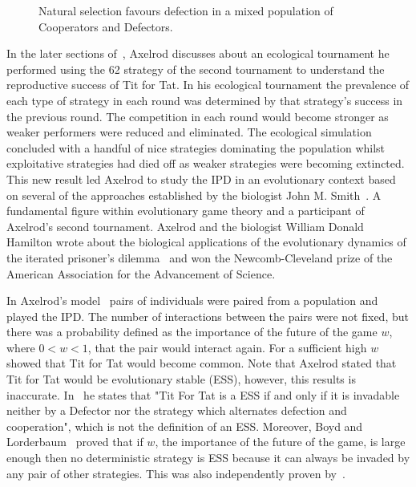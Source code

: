 \documentclass{article}
\theoremstyle{definition}
\begin{document}
\begin{figure}[!hbtp]
    \centering
    
    \caption{Natural selection favours defection in a mixed population of Cooperators
    and Defectors.}\label{fig:natural_selection_diagram}
\end{figure}

In the later sections of~\cite{Axelrod1980b}, Axelrod discusses about an
ecological tournament he performed using the 62 strategy of the second
tournament to understand the reproductive success of Tit for Tat. In his
ecological tournament the prevalence of each type of strategy in each round was
determined by that strategy's success in the previous round. The competition in
each round would become stronger as weaker performers were reduced and
eliminated. The ecological simulation concluded with a handful of nice
strategies dominating the population whilst exploitative strategies had died off
as weaker strategies were becoming extincted. This new result led Axelrod to
study the IPD in an evolutionary context based on several of the approaches
established by the biologist John M. Smith~\cite{Smith1973, Smith1974,
Smith1979}. A fundamental figure within evolutionary game theory and a
participant of Axelrod's second tournament. Axelrod and the biologist William
Donald Hamilton wrote about the biological applications of the evolutionary
dynamics of the iterated prisoner's dilemma~\cite{Axelrod1984} and won the
Newcomb-Cleveland prize of the American Association for the Advancement of
Science.

In Axelrod's model~\cite{axelrod1981} pairs of individuals were paired from a
population and played the IPD. The number of interactions between the pairs were
not fixed, but there was a probability defined as the importance of the future
of the game \(w\), where \(0 < w < 1\), that the pair would interact again. For
a sufficient high \(w\) \cite{axelrod1981} showed that Tit for Tat would become
common. Note that Axelrod stated that Tit for Tat would be evolutionary stable
(ESS), however, this results is inaccurate. In~\cite{axelrod1981} he states that
"Tit For Tat is a ESS if and only if it is invadable neither by a Defector nor
the strategy which alternates defection and cooperation", which is not the
definition of an ESS. Moreover, Boyd and Lorderbaum~\cite{Boyd1987} proved that
if \(w\), the importance of the future of the game, is large enough then no
deterministic strategy is ESS because it can always be invaded by any pair of
other strategies. This was also independently proven by~\cite{Pudaite1987}.
\end{document}
